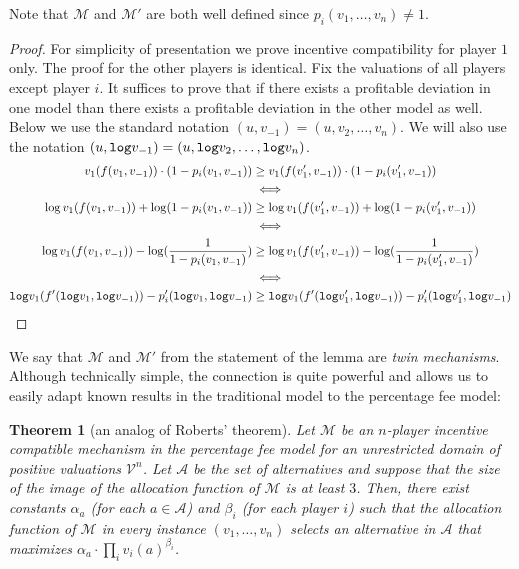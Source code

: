 \documentclass{article}
\newtheorem{theorem}{Theorem}\newtheorem{lemma}[theorem]{Lemma}\newtheorem{proposition}[theorem]{Proposition}\newtheorem{corollary}[theorem]{Corollary}\newtheorem{definition}[theorem]{Definition}\newtheorem{claim}[theorem]{Claim}\newtheorem*{claim*}{Claim}\newenvironment{subproof}{\begin{proof}[Proof of claim]}{\end{proof}}
\newcommand{\cM}{{\mathcal M}}
\newcommand{\cV}{{\mathcal V}}
\begin{document}
Note that $\cM$ and $\cM'$ are both well defined since $p_i(v_1,\ldots, v_n)\neq 1$.



\begin{proof}
For simplicity of presentation we prove incentive compatibility for player $1$ only. The proof for the other players is identical. Fix the valuations of all players except player $i$. It suffices to prove that if there exists a profitable deviation in one model than there exists a profitable deviation in the other model as well. Below we use the standard notation $(u,v_{-1})=(u,v_2,\ldots, v_n)$. We will also use the notation  $(u,{\tt log}v_{-1})=(u,{\tt log}v_2,\ldots, {\tt log}v_n)$.
\begin{align*}
\begin{split}
v_1(f(v_1,v_{-1}))\cdot (1- p_i(v_1,v_{-1})) &\geq v_1(f(v'_1,v_{-1}))\cdot  (1-p_i(v'_1,v_{-1}))\\
&\iff\\
\log v_1(f(v_1,v_{-1}))+\log (1- p_i(v_1,v_{-1})) &\geq \log v_1(f(v'_1,v_{-1}))+\log  (1-p_i(v'_1,v_{-1}))\\
&\iff\\
\log v_1(f(v_1,v_{-1}))-\log (\frac 1 {1- p_i(v_1,v_{-1})}) &\geq 
\log v_1(f(v'_1,v_{-1}))-\log  (\frac 1 {1-p_i(v'_1,v_{-1})})\\
&\iff \\
{\tt log} v_1(f'({\tt log}v_1,{\tt log}v_{-1}))-p'_i({\tt log}v_1,{\tt log}v_{-1}) &\geq
 {\tt log} v_1(f'({\tt log}v'_1,{\tt log}v_{-1}))-p'_i({\tt log}v'_1,{\tt log}v_{-1})
\end{split}
\end{align*}


\end{proof}

We say that $\cM$ and $\cM'$ from the statement of the lemma are \emph{twin mechanisms}. Although technically simple, the connection is quite powerful and allows us to easily adapt known results in the traditional model to the percentage fee model:




\begin{theorem}[an analog of Roberts' theorem]
Let $\cM$ be an $n$-player incentive compatible mechanism in the percentage fee model for an unrestricted domain of positive valuations $\cV^n$. Let $\mathcal A$ be the set of alternatives and suppose that the size of the image of the allocation function of $\cM$ is at least $3$. Then, there exist constants $\alpha_a$ (for each $a\in \mathcal A$) and $\beta_i$ (for each player $i$) such that the allocation function of $\cM$ in every instance $(v_1,\ldots, v_n)$ selects an alternative in $\mathcal A$ that maximizes  $\alpha_a\cdot \prod_iv_i(a)^{\beta_i}$.
\end{theorem}
\end{document}
